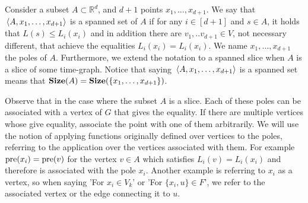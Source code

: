   \begin{definition}
    Consider a subset $A \subset \mathbb{R}^{d}$, and $d+1$ points $x_{1}, \ldots, x_{d+1}$. We say that $\expval*{A, x_{1}, \ldots, x_{d+1}}$ is a spanned set of $A$ if for any $i \in [d+1]$ and $s \in A$, it holds that $L(s) \le L_{i}(x_{i})$ and in addition there are $v_{1},..v_{d+1} \in V$, not necessary different, that achieve the equalities $L_{i}(x_{i}) = L_{i}(x_{i})$.  We name $x_{1}, \ldots, x_{d+1}$ the poles of $A$. Furthermore, we extend the notation to a spanned slice when $A$ is a slice of some time-graph. Notice that saying $\expval*{A, x_{1}, \ldots, x_{d+1}}$ is a spanned set means that $\mathbf{Size}(A) = \mathbf{Size}( \{x_{1}, \ldots, x_{d+1}\})$.
  \end{definition}
  Observe that in the case where the subset $A$ is a slice. Each of these poles can be associated with a vertex of $G$ that gives the equality. If there are multiple vertices whose give equality, associate the point with one of them arbitrarily. We will use the notion of applying functions originally defined over vertices to the poles, referring to the application over the vertices associated with them. For example $\text{pre}(x_{i}) = \text{pre}(v)$ for the vertex $v \in A$ which satisfies $L_{i}(v) = L_{i}(x_i)$ and therefore is associated with the pole $x_{i}$. 
 Another example is referring to $x_{i}$ as a vertex, so when saying 'For $x_{i} \in V_{k}$' or 'For $\{x_{i},u\} \in F$', we refer to the associated vertex or the edge connecting it to $u$.

